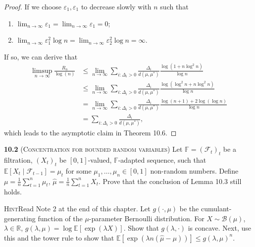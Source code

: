 \begin{proof}
    If we choose $\varepsilon_{1}, \varepsilon_{1}$ to decrease slowly with $n$ such that
    
    \begin{enumerate}
        \item $\lim_{n \to \infty} \varepsilon_{1} = \lim_{n \to \infty} \varepsilon_{1} = 0$;
        \item $\lim_{n \to \infty} \varepsilon_{1}^2 \log n = \lim_{n \to \infty} \varepsilon_{2}^2 \log n = \infty$.
    \end{enumerate}

    If so, we can derive that
    \begin{equation*}
        \begin{aligned}
            \limsup _{n \to \infty} \frac{R_{n}}{\log (n)}
            &\leq \lim _{n \to \infty} \sum_{i: \Delta_i > 0} \frac{\Delta_i}{d(\mu, \mu^*)} \frac{\log(1+n\log^2 n)}{\log n}\\
            &\leq \lim _{n \to \infty} \sum_{i: \Delta_i > 0} \frac{\Delta_i}{d(\mu, \mu^*)} \frac{\log(\log^2 n+n\log^2 n)}{\log n}\\
            &= \lim _{n \to \infty} \sum_{i: \Delta_i > 0} \frac{\Delta_i}{d(\mu, \mu^*)} \frac{\log(n+1) + 2\log(\log n)}{\log n}\\
            &= \sum_{i: \Delta_i > 0} \frac{\Delta_i}{d(\mu, \mu^*)},
        \end{aligned}
    \end{equation*}
    which leads to the asymptotic claim in Theorem 10.6.
\end{proof}

\noindent\textbf{10.2} (\textsc{Concentration for bounded random variables}) Let $\mathbb{F}=\left(\mathcal{F}_{t}\right)_{t}$ be a filtration,
$\left(X_{t}\right)_{t}$ be $[0,1]$-valued, $\mathbb{F}$-adapted sequence,
such that $\mathbb{E}\left[X_{t} \mid \mathcal{F}_{t-1}\right]=\mu_{t}$ for some $\mu_{1}, \ldots, \mu_{n} \in[0,1]$ non-random numbers.
Define $\mu=\frac{1}{n} \sum_{t=1}^{n} \mu_{t}$, $\hat{\mu}=\frac{1}{n} \sum_{t=1}^{n} X_{t}$.
Prove that the conclusion of Lemma 10.3 still holds.

\noindent\textsc{Hint}\quad Read Note 2 at the end of this chapter.
Let $g(\cdot, \mu)$ be the cumulant-generating function of the $\mu$-parameter Bernoulli distribution.
For $X \sim \mathcal{B}(\mu)$, $\lambda \in \mathbb{R}$, $g(\lambda, \mu)=\log \mathbb{E}[\exp (\lambda X)]$.
Show that $g(\lambda, \cdot)$ is concave.
Next, use this and the tower rule to show that $\mathbb{E}[\exp (\lambda n(\hat{\mu}-\mu))] \leq g(\lambda, \mu)^{n}$.

